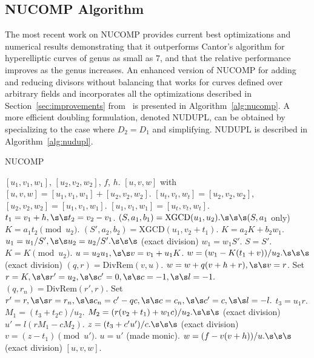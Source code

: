 \subsection{NUCOMP Algorithm} \label{sec:nucomp}
The most recent work on NUCOMP \cite{ImbJac13:amc} provides current best
optimizations and numerical results demonstrating that it outperforms Cantor's
algorithm for hyperelliptic curves of genus as small as $7$, and that the
relative performance improves as the genus increases. An enhanced version of
NUCOMP for adding and reducing divisors without balancing that works for curves
defined over arbitrary fields and incorporates all the optimizations described
in Section~\ref{sec:improvements} from~\cite{ImbJac13:amc} is presented in
Algorithm~\ref{alg:nucomp}. A more efficient doubling formulation, denoted
NUDUPL, can be obtained by specializing to the case where $D_2 = D_1$ and
simplifying. NUDUPL is described in Algorithm~\ref{alg:nudupl}.
\begin{algorithm}[htbp]
  \caption{NUCOMP}
  \label{alg:nucomp}
  \begin{algorithmic}[1]
    \Require $[u_1,v_1,w_1]$, $[u_2,v_2,w_2]$, $f$, $h.$  
    \Ensure $[u,v,w]$ with $[u,v,w] = [u_1,v_1,w_1] + [u_2,v_2,w_2]$.
    \vspace{5pt}
        \State $[u_t,v_t,w_t] = [u_2,v_2,w_2]$, $[u_2,v_2,w_2] = [u_1,v_1,w_1]$.
        \State $[u_1,v_1,w_1] = [u_t,v_t,w_t]$.
    \EndIf
    \State $t_1 = v_1 + h, \s\s t_2 = v_2 - v_1$.
    \State $(S,a_1,b_1) = \mathrm{XGCD}(u_1,u_2). \s\s\s  (S, a_1$ only)
    \State $K = a_1t_2 \pmod{u_2}$.
        \State $(S',a_2,b_2) = \mathrm{XGCD}(u_1,v_2 + t_1)$.
        \State $K = a_2K + b_2w_1$.
            \State $u_1 = u_1/S', \s\s u_2 = u_2/S'. \s\s\s$ (exact division)
            \State $w_1 = w_1S'$.
            \State $S = S'$.
        \EndIf
        \State $K = K \pmod{u_2}$.
    \EndIf
        \State $u = u_2u_1, \s\s v = v_1 + u_1K$.
        \State $w = (w_1 - K(t_1 + v))/u_2. \s\s\s$ (exact division)
            \State $(q,r) = \mathrm{DivRem}(v,u)$.
            \State $w = w + q(v + h + r), \s\s v = r$.
        \EndIf
    \Else
        \State Set $r = K, \s\s r' = u_2, \s\s c' = 0, \s\s c = -1, \s\s l = -1.$
            \State $(q,r_n) = \mathrm{DivRem}(r',r)$.
            \State Set $r' = r, \s\s r = r_n, \s\s c_n = c' - qc, \s\s c = c_n, 
            \s\s c' = c, \s\s l = -l.$
        \EndWhile
        \State $t_3 = u_1r$.
        \State $M_1 = (t_3 + t_2c)/u_2$.
        \State $M_2 = (r(v_2 + t_1) + w_1c)/u_2. \s\s\s$ (exact division)
        \State $u' = l(rM_1 - cM_2)$.
        \State $z = (t_3 + c'u')/c. \s\s\s$ (exact division)
        \State $v = (z - t_1) \pmod{u'}$.
        \State $u = u'$ (made monic).
        \State $w = (f - v(v + h))/u. \s\s\s$ (exact division)
    \EndIf
    \State \Return $[u,v,w]$.
    
  \end{algorithmic}
  \end{algorithm}
